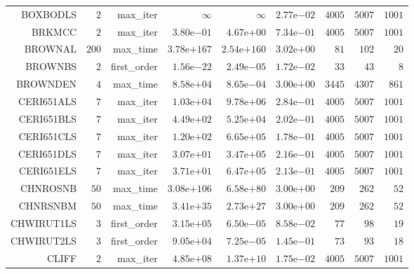 \begin{longtable}{rrrrrrrrr}
BOXBODLS & \(     2\) & max\_iter & \(\infty\) & \(\infty\) & \( 2.77\)e\(-02\) & \(  4005\) & \(  5007\) & \(  1001\) \\
BRKMCC & \(     2\) & max\_iter & \( 3.80\)e\(-01\) & \( 4.67\)e\(+00\) & \( 7.34\)e\(-01\) & \(  4005\) & \(  5007\) & \(  1001\) \\
BROWNAL & \(   200\) & max\_time & \(3.78\)e\(+167\) & \(2.54\)e\(+160\) & \( 3.02\)e\(+00\) & \(    81\) & \(   102\) & \(    20\) \\
BROWNBS & \(     2\) & first\_order & \( 1.56\)e\(-22\) & \( 2.49\)e\(-05\) & \( 1.72\)e\(-02\) & \(    33\) & \(    43\) & \(     8\) \\
BROWNDEN & \(     4\) & max\_time & \( 8.58\)e\(+04\) & \( 8.65\)e\(-04\) & \( 3.00\)e\(+00\) & \(  3445\) & \(  4307\) & \(   861\) \\
CERI651ALS & \(     7\) & max\_iter & \( 1.03\)e\(+04\) & \( 9.78\)e\(+06\) & \( 2.84\)e\(-01\) & \(  4005\) & \(  5007\) & \(  1001\) \\
CERI651BLS & \(     7\) & max\_iter & \( 4.49\)e\(+02\) & \( 5.25\)e\(+04\) & \( 2.02\)e\(-01\) & \(  4005\) & \(  5007\) & \(  1001\) \\
CERI651CLS & \(     7\) & max\_iter & \( 1.20\)e\(+02\) & \( 6.65\)e\(+05\) & \( 1.78\)e\(-01\) & \(  4005\) & \(  5007\) & \(  1001\) \\
CERI651DLS & \(     7\) & max\_iter & \( 3.07\)e\(+01\) & \( 3.47\)e\(+05\) & \( 2.16\)e\(-01\) & \(  4005\) & \(  5007\) & \(  1001\) \\
CERI651ELS & \(     7\) & max\_iter & \( 3.71\)e\(+01\) & \( 6.47\)e\(+05\) & \( 2.13\)e\(-01\) & \(  4005\) & \(  5007\) & \(  1001\) \\
CHNROSNB & \(    50\) & max\_time & \(3.08\)e\(+106\) & \( 6.58\)e\(+80\) & \( 3.00\)e\(+00\) & \(   209\) & \(   262\) & \(    52\) \\
CHNRSNBM & \(    50\) & max\_time & \( 3.41\)e\(+35\) & \( 2.73\)e\(+27\) & \( 3.00\)e\(+00\) & \(   209\) & \(   262\) & \(    52\) \\
CHWIRUT1LS & \(     3\) & first\_order & \( 3.15\)e\(+05\) & \( 6.50\)e\(-05\) & \( 8.58\)e\(-02\) & \(    77\) & \(    98\) & \(    19\) \\
CHWIRUT2LS & \(     3\) & first\_order & \( 9.05\)e\(+04\) & \( 7.25\)e\(-05\) & \( 1.45\)e\(-01\) & \(    73\) & \(    93\) & \(    18\) \\
CLIFF & \(     2\) & max\_iter & \( 4.85\)e\(+08\) & \( 1.37\)e\(+10\) & \( 1.75\)e\(-02\) & \(  4005\) & \(  5007\) & \(  1001\) \\

\end{longtable}
